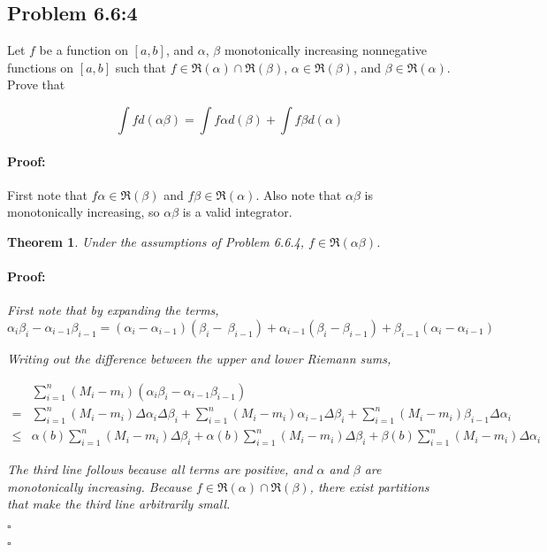 \documentclass{article}
\newcommand{\RiemannIntable}{
  \mathfrak{R}
}
\newenvironment{proof}{\paragraph{Proof:}}{\hfill$\square$}
\newtheorem{theorem}{Theorem}
\begin{document}
\subsection*{Problem 6.6:4}

Let $f$ be a function on $[a, b]$, and $\alpha$, $\beta$ monotonically increasing nonnegative functions on $[a, b]$ such that $f \in \RiemannIntable(\alpha) \cap \RiemannIntable(\beta)$, $\alpha \in \RiemannIntable(\beta)$, and $\beta \in \RiemannIntable(\alpha)$. Prove that

\[
\int f d(\alpha \beta) = \int f \alpha d(\beta) + \int f \beta d(\alpha)
\]

\begin{proof}

First note that $f\alpha \in \RiemannIntable(\beta)$ and $f\beta \in \RiemannIntable(\alpha)$. Also note that $\alpha\beta$ is monotonically increasing, so $\alpha\beta$ is a valid integrator.

\begin{theorem}
Under the assumptions of Problem 6.6.4, $f \in \RiemannIntable(\alpha\beta)$.
\begin{proof}

First note that by expanding the terms,
\[
\alpha_i\beta_i - \alpha_{i-1}\beta_{i-1} = (\alpha_i - \alpha_{i-1})(\beta_i - \ \beta_{i-1})
+ \alpha_{i-1}(\beta_i - \beta_{i-1}) + \beta_{i-1}(\alpha_i - \alpha_{i-1})
\]

Writing out the difference between the upper and lower Riemann sums,

\begin{align*}
& \sum_{i=1}^n (M_i - m_i)(\alpha_i\beta_i - \alpha_{i-1}\beta_{i-1}) \\
= & \sum_{i=1}^n (M_i - m_i)\Delta\alpha_i \Delta\beta_i
+ \sum_{i=1}^n (M_i - m_i)\alpha_{i-1} \Delta\beta_i
+ \sum_{i=1}^n (M_i - m_i)\beta_{i-1} \Delta\alpha_i \\
\leq 
& \alpha(b)\sum_{i=1}^n (M_i - m_i) \Delta\beta_i
+ \alpha(b)\sum_{i=1}^n (M_i - m_i) \Delta\beta_i
+ \beta(b)\sum_{i=1}^n (M_i - m_i) \Delta\alpha_i
\end{align*}

The third line follows because all terms are positive, and $\alpha$ and $\beta$ are monotonically increasing. Because $f \in \RiemannIntable(\alpha)\cap \RiemannIntable(\beta)$, there exist partitions that make the third line arbitrarily small.

\end{proof}
\end{theorem}


\end{proof}
\end{document}
